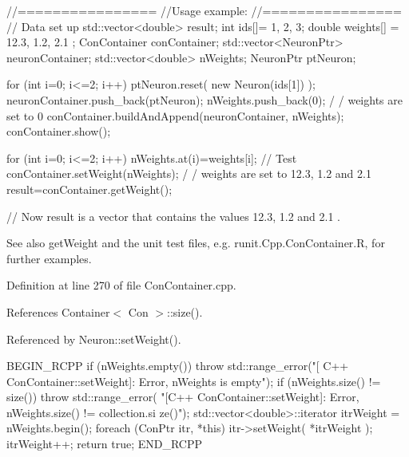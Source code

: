 \begin{DoxyCode}
        //================
        //Usage example:
        //================
        // Data set up
                std::vector<double> result;
                        int ids[]= {1, 2, 3};
                        double weights[] = {12.3, 1.2, 2.1 };
                        ConContainer conContainer;
                        std::vector<NeuronPtr> neuronContainer;
                        std::vector<double> nWeights;
                        NeuronPtr ptNeuron;

                        for (int i=0; i<=2; i++) {
                        ptNeuron.reset( new Neuron(ids[1]) );
                        neuronContainer.push_back(ptNeuron);
                        nWeights.push_back(0);                                  /
      / weights are set to 0
                        }
                        conContainer.buildAndAppend(neuronContainer, nWeights);
                        conContainer.show();

                        for (int i=0; i<=2; i++) {
                                nWeights.at(i)=weights[i];
                        }
        // Test
                        conContainer.setWeight(nWeights);                       /
      / weights are set to 12.3, 1.2 and 2.1
                        result=conContainer.getWeight();

        // Now result is a vector that contains the values 12.3, 1.2 and 2.1 .
\end{DoxyCode}


\begin{DoxySeeAlso}{See also}
getWeight and the unit test files, e.g. runit.Cpp.ConContainer.R, for further examples. 
\end{DoxySeeAlso}


Definition at line 270 of file ConContainer.cpp.



References Container$<$ Con $>$::size().



Referenced by Neuron::setWeight().


\begin{DoxyCode}
{
  BEGIN_RCPP
  if (nWeights.empty())
    { throw std::range_error("[ C++ ConContainer::setWeight]: Error, nWeights is 
      empty");}
  if (nWeights.size() != size())
    {
      throw std::range_error(
          "[C++ ConContainer::setWeight]: Error, nWeights.size() != collection.si
      ze()");
    }
  std::vector<double>::iterator itrWeight = nWeights.begin();
  foreach (ConPtr itr, *this)
    {
      itr->setWeight( *itrWeight );
      itrWeight++;
    }
  return true;
END_RCPP}
\end{DoxyCode}


